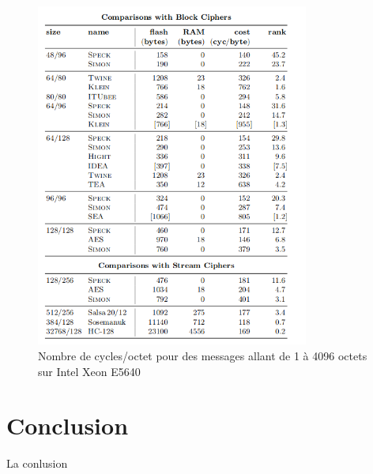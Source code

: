 			\begin{figure}[!h]
				\centering
				\includegraphics[width=0.8\textwidth]{imgs/perfSpeck.png}
				\caption{Nombre de cycles/octet pour des messages allant de 1 à 4096 octets sur Intel Xeon E5640 \cite{speck_micro}}
				\label{perfSpeck}
			\end{figure}



\newpage
\part*{Conclusion}

		La conlusion
